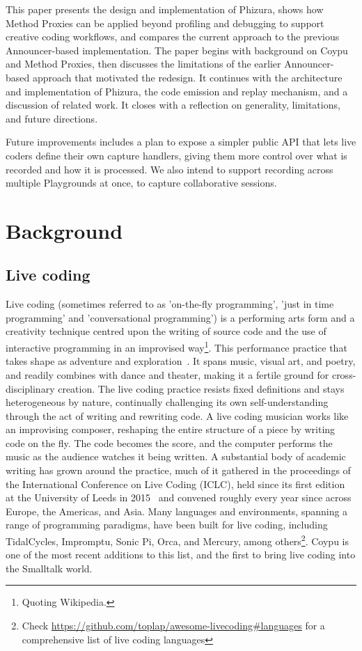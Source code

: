 \documentclass[
]{ceurart}
\begin{document}
This paper presents the design and implementation of Phizura, shows how Method Proxies\cite{Jord24b} can be applied beyond profiling and debugging to support creative coding workflows, and compares the current approach to the previous Announcer-based implementation. The paper begins with background on Coypu and Method Proxies, then discusses the limitations of the earlier Announcer-based approach that motivated the redesign. It continues with the architecture and implementation of Phizura, the code emission and replay mechanism, and a discussion of related work. It closes with a reflection on generality, limitations, and future directions.

Future improvements includes a plan to expose a simpler public API that lets live coders define their own capture handlers, giving them more control over what is recorded and how it is processed. We also intend to support recording across multiple Playgrounds at once, to capture collaborative sessions.

\section{Background}\label{sec:bac}

\subsection{Live coding}
Live coding (sometimes referred to as 'on-the-fly programming', 'just in time programming' and 'conversational programming') is a performing arts form and a creativity technique centred upon the writing of source code and the use of interactive programming in an improvised way\footnote{Quoting Wikipedia.}. This performance practice that takes shape as adventure and exploration~\cite{Blac22a}. It spans music, visual art, and poetry, and readily combines with dance and theater, making it a fertile ground for cross-disciplinary creation. The live coding practice resists fixed definitions and stays heterogeneous by nature, continually challenging its own self-understanding through the act of writing and rewriting code.
A live coding musician works like an improvising composer, reshaping the entire structure of a piece by writing code on the fly. The code becomes the score, and the computer performs the music as the audience watches it being written.
A substantial body of academic writing has grown around the practice, much of it gathered in the proceedings of the International Conference on Live Coding (ICLC), held since its first edition at the University of Leeds in 2015~\cite{McLe15a} and convened roughly every year since across Europe, the Americas, and Asia.
Many languages and environments, spanning a range of programming paradigms, have been built for live coding, including TidalCycles, Impromptu, Sonic Pi, Orca, and Mercury, among others\footnote{Check \url{https://github.com/toplap/awesome-livecoding\#languages} for a comprehensive list of live coding languages}. Coypu is one of the most recent additions to this list, and the first to bring live coding into the Smalltalk world.
\end{document}
